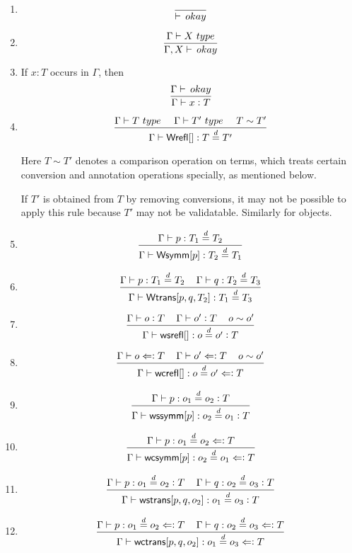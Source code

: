 \documentclass[11pt]{article}
\newcommand{\eqd}{\stackrel{d}{=}}
\newcommand{\spc}{{\,\,\,\,\,\,\,}}
\newcommand{\synth}{\vcentcolon} %
\newcommand{\ccheck}{\Leftarrow\vcentcolon}
\newcommand{\Type}{\mathop{{\, \sc type}}}
\newcommand{\Okay}{\mathop{{\, \sc okay}}}
\newcommand{\ha}[2]{#1[#2]}
\newcommand{\Wrefl}{{\sf Wrefl}}
\newcommand{\Wtrans}{{\sf Wtrans}}
\newcommand{\Wsymm}{{\sf Wsymm}}
\newcommand{\wsrefl}{{\sf wsrefl}}
\newcommand{\wcrefl}{{\sf wcrefl}}
\newcommand{\wssymm}{{\sf wssymm}}
\newcommand{\wcsymm}{{\sf wcsymm}}
\newcommand{\wstrans}{{\sf wstrans}}
\newcommand{\wctrans}{{\sf wctrans}}
\begin{document}
\begin{enumerate}

\item
$$\frac{}{\vdash\Okay}$$

\item
$$\frac{\Gamma\vdash X \Type}{\Gamma,X\vdash\Okay}$$

\item 
If $x:T$ occurs in $\Gamma$, then
$$\frac{\Gamma\vdash\Okay}{\Gamma\vdash x \synth T}$$

\item 
$$\frac{\Gamma \vdash T \Type\spc \Gamma \vdash T'\Type \spc T\sim T'}{\Gamma\vdash \ha\Wrefl{}: T\eqd T'}$$

Here $T\sim T'$ denotes a comparison operation on terms, which treats certain
conversion and annotation operations specially, as mentioned below.

If $T'$ is obtained from $T$ by removing conversions, it may not be possible to apply
this rule because $T'$ may not be validatable.  Similarly for objects.

\item 
$$\frac{\Gamma\vdash p:T_1\eqd T_2}{\Gamma\vdash \ha\Wsymm{p}:T_2\eqd T_1}$$

\item 
$$\frac{\Gamma\vdash p:T_1\eqd T_2\spc\Gamma\vdash q:T_2\eqd T_3}{\Gamma\vdash \ha\Wtrans{p,q,T_2}: T_1\eqd T_3}$$

\item 
$$\frac{\Gamma\vdash o \synth T\spc\Gamma\vdash o' \synth T \spc o \sim o'}{\Gamma\vdash \ha\wsrefl{}:o\eqd o' \synth T}$$

\item 
$$\frac{\Gamma\vdash o \ccheck T\spc\Gamma\vdash o' \ccheck T \spc o \sim o'}{\Gamma\vdash \ha\wcrefl{}:o\eqd o' \ccheck T}$$

\item 
$$\frac{\Gamma\vdash p:o_1\eqd o_2 \synth T}{\Gamma\vdash \ha\wssymm{p}:o_2\eqd o_1 \synth T}$$

\item 
$$\frac{\Gamma\vdash p:o_1\eqd o_2 \ccheck T}{\Gamma\vdash \ha\wcsymm{p}:o_2\eqd o_1 \ccheck T}$$

\item 
$$\frac{\Gamma\vdash p:o_1\eqd o_2 \synth T\spc\Gamma\vdash q:o_2\eqd o_3 \synth T}{\Gamma\vdash \ha\wstrans{p,q,o_2}:o_1\eqd o_3 \synth T}$$

\item 
$$\frac{\Gamma\vdash p:o_1\eqd o_2 \ccheck T\spc\Gamma\vdash q:o_2\eqd o_3 \ccheck T}{\Gamma\vdash \ha\wctrans{p,q,o_2}:o_1\eqd o_3 \ccheck T}$$


\end{enumerate}
\end{document}
